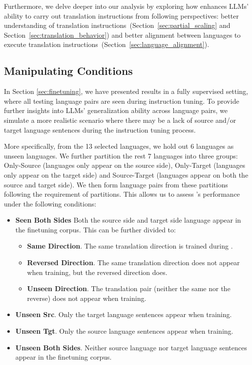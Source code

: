 Furthermore, we delve deeper into our analysis by exploring how \method enhances LLMs' ability to 
carry out translation instructions from following perspectives: better understanding of translation instructions~(Section~\ref{sec:partial_scaling} and Section~\ref{sec:translation_behavior}) and better alignment between languages to execute translation instructions~(Section~\ref{sec:language_alignment}).


\subsection{Manipulating Conditions}
\label{sec:conditions}
In Section \ref{sec:finetuning}, we have presented results in a fully supervised setting, where all testing language pairs are seen during instruction tuning.  To provide further insights into LLMs' generalization ability across language pairs, we simulate a more realistic scenario where there may be a lack of source and/or target language sentences during the instruction tuning process.

More specifically, from the 13 selected languages, we hold out 6 languages as unseen languages.
We further partition the rest 7 languages into three groups: Only-Source (languages only appear on the source side), Only-Target (languages only appear on the target side) and Source-Target (languages appear on both the source and target side). We then form language pairs from these partitions following the requirement of partitions. This allows us to assess \methodend's performance under the following conditions:

\begin{itemize}
    \item \textbf{Seen Both Sides} Both the source side and target side language appear in the finetuning corpus. This can be further divided to:
        \begin{itemize}
            \item \textbf{Same Direction}. The same translation direction is trained during \methodend.
            \item \textbf{Reversed Direction}. The same translation direction does not appear when training, but the reversed direction does.
            \item \textbf{Unseen Direction}. The translation pair (neither the same nor the reverse) does not appear when training.
        \end{itemize}
    \item \textbf{Unseen Src}. Only the target language sentences appear when training.
    \item \textbf{Unseen Tgt}. Only the source language sentences appear when training.
    \item \textbf{Unseen Both Sides}. Neither source language nor target language sentences appear in the finetuning corpus.
\end{itemize}


